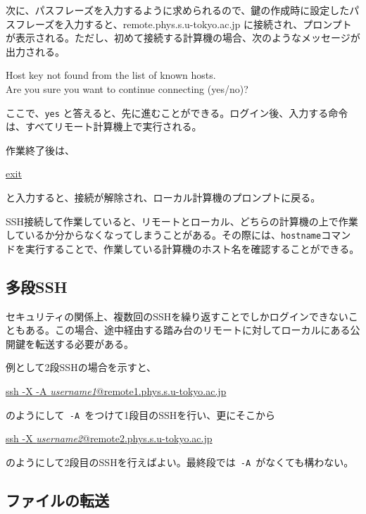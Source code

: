 次に、パスフレーズを入力するように求められるので、鍵の作成時に設定したパスフレーズを入力すると、remote.phys.s.u-tokyo.ac.jp に接続され、プロンプトが表示される。ただし、初めて接続する計算機の場合、次のようなメッセージが出力される。
\begin{commandline2}
    Host key not found from the list of known hosts.\\
    Are you sure you want to continue connecting (yes/no)?
\end{commandline2} \noindent
ここで、\texttt{yes} と答えると、先に進むことができる。ログイン後、入力する命令は、すべてリモート計算機上で実行される。

作業終了後は、
\begin{commandline2}
    \prompt \underline{exit}
\end{commandline2} \noindent
と入力すると、接続が解除され、ローカル計算機のプロンプトに戻る。

SSH接続して作業していると、リモートとローカル、どちらの計算機の上で作業しているか分からなくなってしまうことがある。その際には、\texttt{hostname}コマンドを実行することで、作業している計算機のホスト名を確認することができる。

\subsection{多段SSH}

セキュリティの関係上、複数回のSSHを繰り返すことでしかログインできないこともある。この場合、途中経由する踏み台のリモートに対してローカルにある公開鍵を転送する必要がある。

例として2段SSHの場合を示すと、

\begin{commandline2}
    \prompt \underline{ssh -X -A \textit{username1}@remote1.phys.s.u-tokyo.ac.jp}
\end{commandline2} \noindent

のようにして\texttt{ -A }をつけて1段目のSSHを行い、更にそこから

\begin{commandline2}
    \prompt \underline{ssh -X \textit{username2}@remote2.phys.s.u-tokyo.ac.jp}
\end{commandline2} \noindent

のようにして2段目のSSHを行えばよい。最終段では\texttt{ -A }がなくても構わない。

\subsection{ファイルの転送}

